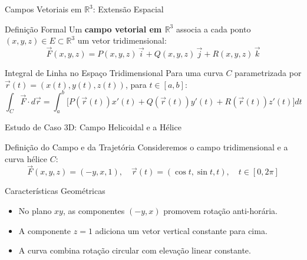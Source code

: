 \documentclass[aspectratio=169, 13pt]{beamer}
\begin{document}
	\begin{frame}{Campos Vetoriais em $\mathbb{R}^3$: Extensão Espacial}
		\begin{block}{Definição Formal}
			Um \textbf{campo vetorial em $\mathbb{R}^3$} associa a cada ponto $(x,y,z) \in E \subset \mathbb{R}^3$ um vetor tridimensional:
			$$\vec{F}(x,y,z) = P(x,y,z)\,\vec{i} + Q(x,y,z)\,\vec{j} + R(x,y,z)\,\vec{k}$$
		\end{block}
		
		\vspace{0.2cm}
		\begin{exampleblock}{Integral de Linha no Espaço Tridimensional}
			Para uma curva $C$ parametrizada por $\vec{r}(t) = (x(t), y(t), z(t))$, para $t \in [a,b]$:
			$$\int_C \vec{F} \cdot d\vec{r} = \int_{a}^{b} \Big[ P(\vec{r}(t))x'(t) + Q(\vec{r}(t))y'(t) + R(\vec{r}(t))z'(t) \Big] dt$$
		\end{exampleblock}
	\end{frame}
	
	\begin{frame}{Estudo de Caso 3D: Campo Helicoidal e a Hélice}
		\begin{block}{Definição do Campo e da Trajetória}
			Consideremos o campo tridimensional e a curva hélice $C$:
			$$\vec{F}(x,y,z) = (-y, x, 1), \quad \vec{r}(t) = (\cos t, \sin t, t), \quad t \in [0, 2\pi]$$
		\end{block}
		
		\vspace{0.2cm}
		\begin{block}{Características Geométricas}
			\begin{itemize}
				\item No plano $xy$, as componentes $(-y, x)$ promovem rotação anti-horária.
				\item A componente $z = 1$ adiciona um vetor vertical constante para cima.
				\item A curva combina rotação circular com elevação linear constante.
			\end{itemize}
		\end{block}
	\end{frame}
	
\end{document}
